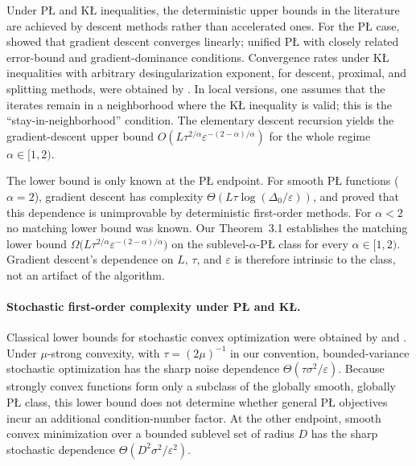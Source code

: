 \documentclass[11pt]{article}
\begin{document}
Under P\L{} and K\L{} inequalities, the deterministic upper bounds in the literature are achieved by descent methods
rather than accelerated ones. For the P\L{} case, \citet{Polyak1963} showed that gradient descent converges
linearly; \citet{KarimiNutiniSchmidt2016} unified P\L{} with closely related error-bound and gradient-dominance
conditions. Convergence rates under K\L{} inequalities with arbitrary desingularization exponent, for descent,
proximal, and splitting methods, were obtained by
\citet{AttouchBolteRedontSoubeyran2010,BolteSabachTeboulle2014,FrankelGarrigosPeypouquet2015}. In local versions, one assumes that the iterates remain in a neighborhood where the K\L{} inequality is valid; this is the ``stay-in-neighborhood'' condition.
The elementary descent recursion yields the gradient-descent upper
bound
$
O\left(L\tau^{2/\alpha}\varepsilon^{-(2-\alpha)/\alpha}\right)
$
for the whole regime \(\alpha\in[1,2)\).

The lower bound is only known at the P\L{} endpoint. For smooth P\L{} functions
(\(\alpha=2\)), gradient descent has complexity \(\Theta(L\tau\log(\Delta_0/\varepsilon))\), and
\citet{YueFangLin2023} proved that this dependence is unimprovable by deterministic first-order methods. For $\alpha < 2$ no matching lower bound was known. Our Theorem~3.1 establishes the matching lower bound $\Omega\bigl(L\tau^{2/\alpha}\varepsilon^{-(2-\alpha)/\alpha}\bigr)$ on the sublevel-$\alpha$-P\L{} class for every $\alpha \in [1,2)$. Gradient descent's dependence on $L$, $\tau$, and $\varepsilon$ is therefore intrinsic to the class, not an artifact of the algorithm.

\paragraph{Stochastic first-order complexity under P\L{} and K\L.}
Classical lower bounds for stochastic convex optimization were obtained by
\citet{NemirovskiJuditskyLanShapiro2009} and \citet{AgarwalBartlettRavikumarWainwright2012}. Under
$\mu$-strong convexity, with $\tau=(2\mu)^{-1}$ in our convention, bounded-variance stochastic optimization has the
sharp noise dependence $\Theta(\tau\sigma^2/\varepsilon)$. Because strongly convex functions form
only a subclass of the globally smooth, globally P\L{} class, this lower bound does not determine whether general
P\L{} objectives incur an additional condition-number factor. At the other endpoint, smooth convex minimization over a bounded sublevel set of radius $D$
has the sharp stochastic dependence $\Theta(D^2\sigma^2/\varepsilon^2)$.
\end{document}
